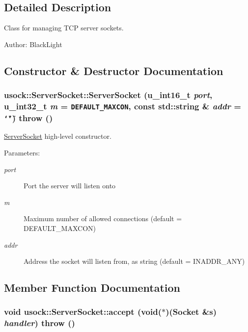 \subsection{Detailed Description}
Class for managing TCP server sockets. 

\begin{Desc}
\item[Author:]BlackLight \end{Desc}


\subsection{Constructor \& Destructor Documentation}
\hypertarget{classusock_1_1ServerSocket_0ac1908d4a4afb675715ae0ad994e870}{
\subsubsection[{ServerSocket}]{\setlength{\rightskip}{0pt plus 5cm}usock::ServerSocket::ServerSocket (u\_\-int16\_\-t {\em port}, \/  u\_\-int32\_\-t {\em m} = {\tt DEFAULT\_\-MAXCON}, \/  const std::string \& {\em addr} = {\tt \char`\"{}\char`\"{}})  throw ()}}
\label{classusock_1_1ServerSocket_0ac1908d4a4afb675715ae0ad994e870}


\hyperlink{classusock_1_1ServerSocket}{ServerSocket} high-level constructor. 

\begin{Desc}
\item[Parameters:]
\begin{description}
\item[{\em port}]Port the server will listen onto \item[{\em m}]Maximum number of allowed connections (default = DEFAULT\_\-MAXCON) \item[{\em addr}]Address the socket will listen from, as string (default = INADDR\_\-ANY) \end{description}
\end{Desc}


\subsection{Member Function Documentation}
\hypertarget{classusock_1_1ServerSocket_0ef5b201140a37c5d7c42aced9a45f2e}{
\subsubsection[{accept}]{\setlength{\rightskip}{0pt plus 5cm}void usock::ServerSocket::accept (void($\ast$)({\bf Socket} \&s) {\em handler})  throw ()}}
\label{classusock_1_1ServerSocket_0ef5b201140a37c5d7c42aced9a45f2e}


